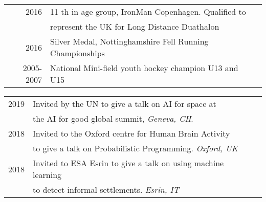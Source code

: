 \documentclass[10pt,a4paper]{altacv}
\begin{document}


\begin{tabular}{rll}
	2016      & 11 th in age group, IronMan Copenhagen. Qualified to     \\
	          & represent the UK for Long Distance Duathalon             \\
	2016      & Silver Medal, Nottinghamshire Fell Running Championships \\
	2005-2007 & National Mini-field youth hockey champion U13 and U15
\end{tabular}



\begin{tabular}{rll}
	2019 & Invited by the UN to give a talk on AI for space at            \\
	     & the AI for good global summit, \emph{Geneva, CH}.              \\
	2018 & Invited to the Oxford centre for Human Brain Activity          \\
	     & to give a talk on Probabilistic Programming. \emph{Oxford, UK} \\
	2018 & Invited to ESA Esrin to give  a talk on using machine learning \\
	     & to detect informal settlements. \emph{Esrin, IT}               \\
\end{tabular}







\end{document}
